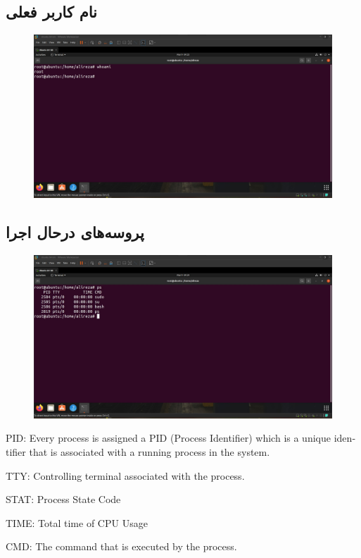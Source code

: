 \documentclass{article}
\begin{document}
\subsection{نام کاربر فعلی}
\begin{figure}[H]
    \centering
    \includegraphics[width=1.0\textwidth]{figures/2d.jpg}
    \caption
	{
	}
    \label{fig:fig1}
\end{figure}

\subsection{پروسه‌های درحال اجرا}
\begin{figure}[H]
    \centering
    \includegraphics[width=1.0\textwidth]{figures/2e.jpg}
    \caption
	{
	}
    \label{fig:fig1}
\end{figure}

\begin{latin}

PID: Every process is assigned a PID (Process Identifier) which is a unique identifier that is associated with a running process in the system.

TTY: Controlling terminal associated with the process.

STAT: Process State Code

TIME: Total time of CPU Usage

CMD: The command that is executed by the process.
\end{latin}
\end{document}
